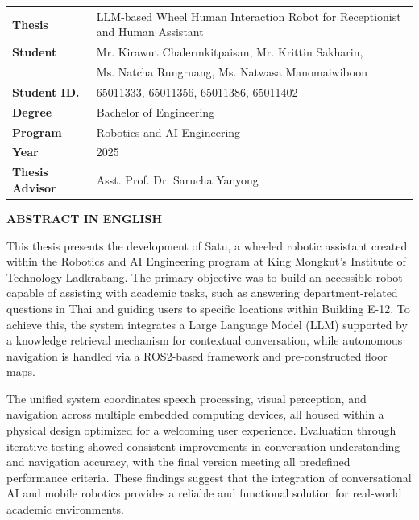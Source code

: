 
\noindent
\begin{tabular}{ll}
\textbf{Thesis} & LLM-based Wheel Human Interaction Robot for Receptionist and Human Assistant \\
\textbf{Student} & Mr. Kirawut Chalermkitpaisan, Mr. Krittin Sakharin, \\
                 & Ms. Natcha Rungruang, Ms. Natwasa Manomaiwiboon \\
\textbf{Student ID.} & 65011333, 65011356, 65011386, 65011402 \\
\textbf{Degree} & Bachelor of Engineering \\
\textbf{Program} & Robotics and AI Engineering \\
\textbf{Year} & 2025 \\
\textbf{Thesis Advisor} & Asst. Prof. Dr. Sarucha Yanyong \\
\end{tabular}

\vspace{1cm}

\begin{center}
\textbf{\Large ABSTRACT IN ENGLISH}
\end{center}

\vspace{0cm}

This thesis presents the development of Satu, a wheeled robotic assistant created within the Robotics and AI Engineering program at King Mongkut's Institute of Technology Ladkrabang. The primary objective was to build an accessible robot capable of assisting with academic tasks, such as answering department-related questions in Thai and guiding users to specific locations within Building E-12. To achieve this, the system integrates a Large Language Model (LLM) supported by a knowledge retrieval mechanism for contextual conversation, while autonomous navigation is handled via a ROS2-based framework and pre-constructed floor maps.

The unified system coordinates speech processing, visual perception, and navigation across multiple embedded computing devices, all housed within a physical design optimized for a welcoming user experience. Evaluation through iterative testing showed consistent improvements in conversation understanding and navigation accuracy, with the final version meeting all predefined performance criteria. These findings suggest that the integration of conversational AI and mobile robotics provides a reliable and functional solution for real-world academic environments.